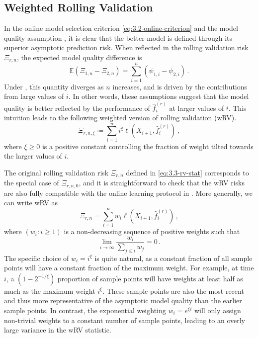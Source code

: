 \documentclass[11pt]{article}
\theoremstyle{plain}
\begin{document}
\subsection{Weighted Rolling Validation}\label{subsec:3.4-wrv}
In the online model selection criterion \eqref{eq:3.2-online-criterion} and the model quality assumption , it is clear that the better model is defined through its superior asymptotic prediction risk. When reflected in the rolling validation risk $\Xi_{r,n}$, the expected model quality difference is 
$$
\mathbb E(\Xi_{1,n}-\Xi_{2,n}) = \sum_{i=1}^n (\psi_{1,i}-\psi_{2,i})\,.
$$
Under , this quantity diverges as $n$ increases, and is driven by the contributions from large values of $i$.  In other words, these assumptions suggest that the model quality is better reflected by the performance of $\hat f_{i}^{(r)}$ at larger values of $i$. This intuition leads to the following weighted version of rolling validation (wRV).
\begin{equation}\label{eq:3.4-wrv}
    \Xi_{r,n,\xi} \coloneqq \sum_{i=1}^n i^\xi \ell(X_{i+1},\hat f_i^{(r)})\,,
\end{equation}
where $\xi\ge 0$ is a positive constant controlling the fraction of weight tilted towards the larger values of $i$.

The original rolling validation risk  $\Xi_{r,n}$ defined in \eqref{eq:3.3-rv-stat} corresponds to the special case of $\Xi_{r,n,0}$, and it is straightforward to check that the wRV risks are also fully compatible with the online learning protocol in .  More generally, we can write wRV as
$$\Xi_{r,n}=\sum_{i=1}^n w_i \ell(X_{i+1},\hat f_i^{(r)})\,,$$
where $(w_i:i\ge 1)$ is a non-decreasing sequence of positive weights such that
$$\lim_{i\rightarrow \infty}\frac{w_i}{\sum_{j\le i} w_j}=0\,.$$
The specific choice of $w_i=i^\xi$ is quite natural, as a constant fraction of all sample points will have a constant fraction of the maximum weight. For example, at time $i$, a $(1-2^{-1/\xi})$ proportion of sample points will have weights at least half as much as the maximum weight $i^\xi$. These sample points are also the most recent and thus more representative of the asymptotic model quality than the earlier sample points.  In contrast, the exponential weighting $w_i=e^{\xi i}$ will only assign non-trivial weights to a constant number of sample points, leading to an overly large variance in the wRV statistic.
\end{document}

